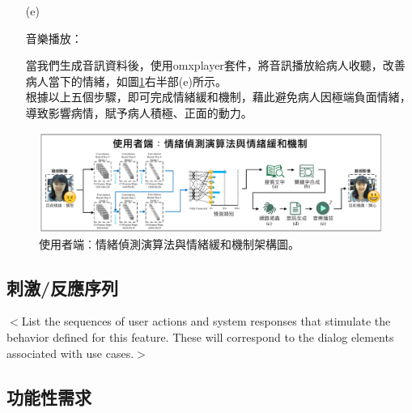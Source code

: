 \documentclass[12pt]{scrreprt}
\begin{document}
\begin{itemize}
\begin{itemize}
\item[(e)]{\begin{bfseries}{音樂播放：}\end{bfseries}}

當我們生成音訊資料後，使用omxplayer套件，將音訊播放給病人收聽，改善病人當下的情緒，如圖\ref{fig:FrameworkFirstAndSecond}右半部(e)所示。\\

根據以上五個步驟，即可完成情緒緩和機制，藉此避免病人因極端負面情緒，導致影響病情，賦予病人積極、正面的動力。\\

\end{itemize}
\end{itemize}

\begin{figure}[!h]
\begin{center}
\includegraphics[width=1\textwidth]{./figs/FrameworkFirstAndSecond.pdf}
\end{center}
\caption{使用者端︰情緒偵測演算法與情緒緩和機制架構圖。}
\label{fig:FrameworkFirstAndSecond}
\end{figure}

\subsection{刺激/反應序列}
$<$List the sequences of user actions and system responses that stimulate the 
behavior defined for this feature. These will correspond to the dialog elements 
associated with use cases.$>$

\subsection{功能性需求}
\end{document}
